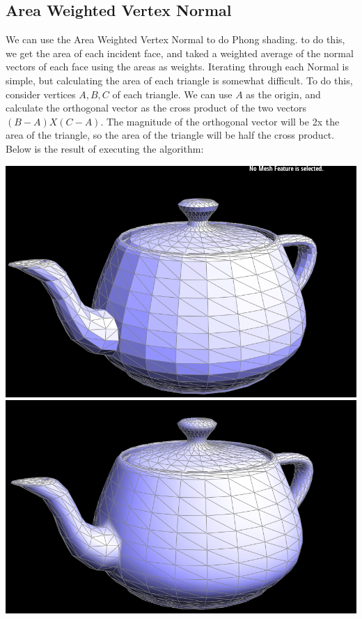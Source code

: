 \documentclass{article}
\begin{document}
\subsection{Area Weighted Vertex Normal}
We can use the Area Weighted Vertex Normal to do Phong shading. to do this, we get the area of each incident face, and taked a weighted average of the normal vectors of each face using the areas as weights. Iterating through each Normal is simple, but calculating the area of each triangle is somewhat difficult. To do this, consider vertices $A, B, C$ of each triangle. We can use $A$ as the origin, and calculate the orthogonal vector as the cross product of the two vectors $(B - A) X (C - A)$. The magnitude of the orthogonal vector will be 2x the area of the triangle, so the area of the triangle will be half the cross product. Below is the result of executing the algorithm:
\begin{center}
    \includegraphics[]{Part 3/nophong.png}
    \includegraphics[]{Part 3/phong.png}
\end{center}
\end{document}
